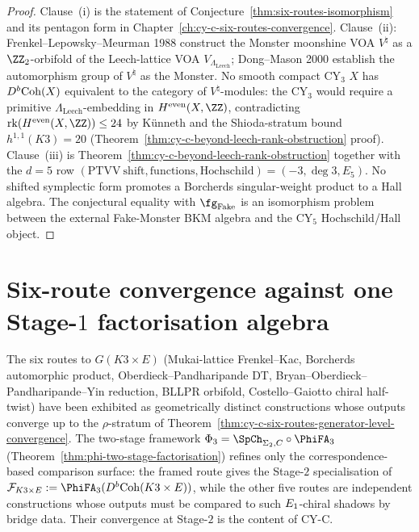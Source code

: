 \begin{proof}
Clause~(i) is the statement of
Conjecture~\ref{thm:six-routes-isomorphism} and its pentagon form in
Chapter~\ref{ch:cy-c-six-routes-convergence}. Clause~(ii):
Frenkel--Lepowsky--Meurman 1988 construct the Monster moonshine VOA
$V^{\natural}$ as a $\ZZ_2$-orbifold of the Leech-lattice VOA
$V_{\Lambda_{\mathrm{Leech}}}$; Dong--Mason 2000 establish the
automorphism group of $V^{\natural}$ as the Monster. No smooth
compact CY$_3$ $X$ has $D^b\mathrm{Coh}(X)$ equivalent to the category of
$V^{\natural}$-modules: the CY$_3$ would require a primitive
$\Lambda_{\mathrm{Leech}}$-embedding in $H^{\mathrm{even}}(X, \ZZ)$,
contradicting $\mathrm{rk}(H^{\mathrm{even}}(X, \ZZ)) \leq 24$ by
K\"unneth and the Shioda-stratum bound $h^{1, 1}(K3) = 20$
(Theorem~\ref{thm:cy-c-beyond-leech-rank-obstruction} proof).
Clause~(iii) is Theorem~\ref{thm:cy-c-beyond-leech-rank-obstruction}
together with the $d=5$ row
$(\mathrm{PTVV\ shift},\mathrm{functions},\mathrm{Hochschild})
=(-3,\deg 3,E_5)$. No shifted symplectic form promotes a Borcherds
singular-weight product to a Hall algebra. The conjectural equality
with $\fg_{\mathrm{Fake}}$ is an isomorphism problem between the
external Fake-Monster BKM algebra and the CY$_5$ Hochschild/Hall object.
\end{proof}

\section{Six-route convergence against one Stage-\texorpdfstring{$1$}{1} factorisation algebra}
\label{sec:cy-c-beyond-six-route-stage-1-2}

The six routes to $G(K3 \times E)$ (Mukai-lattice Frenkel--Kac,
Borcherds automorphic product, Oberdieck--Pandharipande DT,
Bryan--Oberdieck--Pandharipande--Yin reduction, BLLPR orbifold,
Costello--Gaiotto chiral half-twist) have been exhibited as
geometrically distinct constructions whose outputs converge
up to the $\rho$-stratum of
Theorem~\ref{thm:cy-c-six-routes-generator-level-convergence}. The
two-stage framework $\Phi_3 = \SpCh_{\Sigma_2, C} \circ \PhiFA_3$
(Theorem~\ref{thm:phi-two-stage-factorisation}) refines only the
correspondence-based comparison surface: the framed route gives the
Stage-$2$ specialisation of
$\mathcal F_{K3 \times E} := \PhiFA_3(D^b\Coh(K3 \times E))$, while the
other five routes are independent constructions whose outputs must be
compared to such $E_{1}$-chiral shadows by bridge data. Their convergence
at Stage-$2$ is the content of CY-C.

